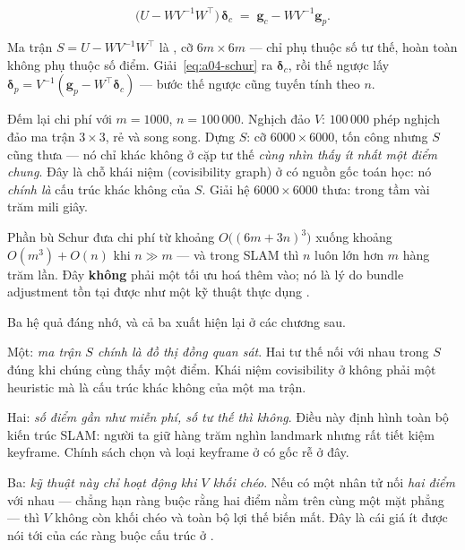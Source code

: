 \documentclass[../../vslam.tex]{subfiles}
\begin{document}
\begin{equation}
\bigl(U - W V^{-1} W^{\top}\bigr)\,\boldsymbol{\delta}_c \;=\; \mathbf{g}_c - W V^{-1}\mathbf{g}_p .
\label{eq:a04-schur}
\end{equation}

Ma trận \(S = U - WV^{-1}W^{\top}\) là , cỡ \(6m \times 6m\) --- chỉ phụ thuộc số tư thế, hoàn toàn không phụ thuộc số điểm. Giải~\eqref{eq:a04-schur} ra \(\boldsymbol{\delta}_c\), rồi thế ngược lấy \(\boldsymbol{\delta}_p = V^{-1}(\mathbf{g}_p - W^{\top}\boldsymbol{\delta}_c)\) --- bước thế ngược cũng tuyến tính theo \(n\).

Đếm lại chi phí với \(m=1000\), \(n=100\,000\). Nghịch đảo \(V\): \(100\,000\) phép nghịch đảo ma trận \(3\times3\), rẻ và song song. Dựng \(S\): cỡ \(6000\times 6000\), tốn công nhưng \(S\) cũng thưa --- nó chỉ khác không ở cặp tư thế \emph{cùng nhìn thấy ít nhất một điểm chung}. Đây là chỗ khái niệm  (covisibility graph) ở  có nguồn gốc toán học: nó \emph{chính là} cấu trúc khác không của \(S\). Giải hệ \(6000\times 6000\) thưa: trong tầm vài trăm mili giây.

\begin{cannho}
Phần bù Schur đưa chi phí từ khoảng \(O\bigl((6m+3n)^3\bigr)\) xuống khoảng \(O(m^3) + O(n)\) khi \(n \gg m\) --- và trong SLAM thì \(n\) luôn lớn hơn \(m\) hàng trăm lần. Đây \textbf{không} phải một tối ưu hoá thêm vào; nó là lý do bundle adjustment tồn tại được như một kỹ thuật thực dụng \cite[§6]{triggs2000ba}.

Ba hệ quả đáng nhớ, và cả ba xuất hiện lại ở các chương sau.

Một: \emph{ma trận \(S\) chính là đồ thị đồng quan sát}. Hai tư thế nối với nhau trong \(S\) đúng khi chúng cùng thấy một điểm. Khái niệm covisibility ở  không phải một heuristic mà là cấu trúc khác không của một ma trận.

Hai: \emph{số điểm gần như miễn phí, số tư thế thì không}. Điều này định hình toàn bộ kiến trúc SLAM: người ta giữ hàng trăm nghìn landmark nhưng rất tiết kiệm keyframe. Chính sách chọn và loại keyframe ở  có gốc rễ ở đây.

Ba: \emph{kỹ thuật này chỉ hoạt động khi \(V\) khối chéo}. Nếu có một nhân tử nối \emph{hai điểm} với nhau --- chẳng hạn ràng buộc rằng hai điểm nằm trên cùng một mặt phẳng --- thì \(V\) không còn khối chéo và toàn bộ lợi thế biến mất. Đây là cái giá ít được nói tới của các ràng buộc cấu trúc ở .
\end{cannho}
\end{document}
